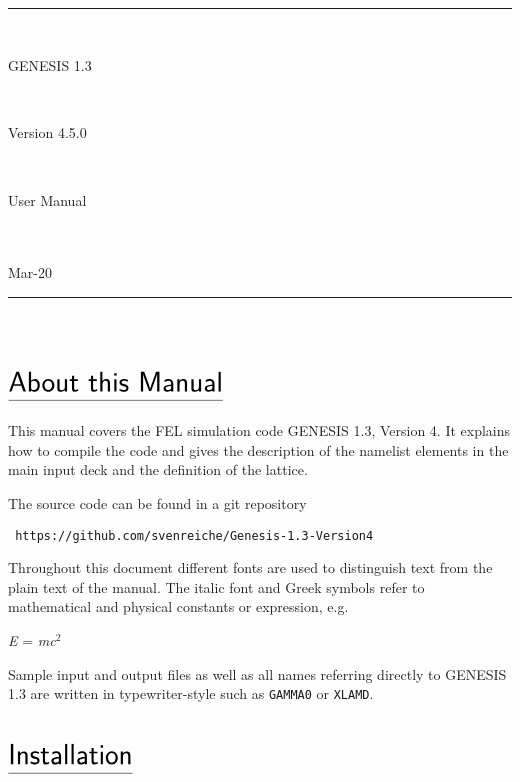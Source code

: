 \documentclass[12pt]{book}
\begin{document}
{
\setlength{\parskip}{0cm}
   
{~}\\
\thispagestyle{empty}
\rule{\textwidth}{0.2cm}\\
{\rule{0cm}{4cm}\Huge\sf\hspace{2cm}GENESIS 1.3}\\
\vspace{1cm}
{\rule{0cm}{2cm}\LARGE\sf\hspace{2cm}Version 4.5.0}\\
\vspace{1cm}
{\rule{0cm}{2cm}\LARGE\sf\hspace{2cm}User Manual}\\
\vspace{10cm}\\
{\sf Mar-20}\\
\rule{\textwidth}{0.2cm}\\
\vspace{5cm}
\pagebreak

\tableofcontents
 
}
   
\chapter*{\vspace{-3cm}$\underline{\mbox{\rule[-0.5em]{0cm}{1em}\huge\sf About this Manual}}$}
 
This manual covers the FEL simulation code GENESIS 1.3, Version 4. It explains how to compile the code and gives the description of the namelist elements in the main input deck and the definition of the lattice.

The source code can be found in a git repository

{\tt
https://github.com/svenreiche/Genesis-1.3-Version4
}


Throughout this document different fonts are used to distinguish text from the plain text 
of the manual. The italic font and Greek symbols refer to mathematical and physical 
constants or expression, e.g.

{\it E} = {\it mc}$^{2}$

Sample input and output files as well as all names referring directly to GENESIS 1.3 are 
written in typewriter-style such as {\tt GAMMA0} or {\tt XLAMD}.




\chapter*{\vspace{-3cm}$\underline{\mbox{\rule[-0.5em]{0cm}{1em}\huge\sf Installation}}$}
 
\end{document}
